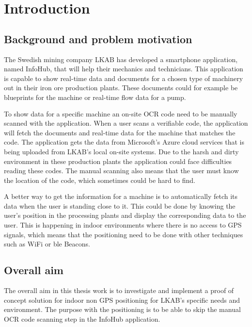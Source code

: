 \chapter{Introduction}\label{sec:intro} 

\section{Background and problem motivation}\label{sec:introBackground}
The Swedish mining company LKAB has developed a smartphone application, named InfoHub, that will help their mechanics and technicians.
This application is capable to show real-time data and documents for a chosen type of machinery out in their iron ore production plants.
These documents could for example be blueprints for the machine or real-time flow data for a pump.

\bigskip

To show data for a specific machine an on-site OCR code need to be manually scanned with the application.
When a user scans a verifiable code, the application will fetch the documents and real-time data for the machine that matches the code.
The application gets the data from Microsoft’s Azure cloud services that is being uploaded from LKAB’s local on-site systems.
Due to the harsh and dirty environment in these production plants the application could face difficulties reading these codes.
The manual scanning also means that the user must know the location of the code, which sometimes could be hard to find.

\bigskip

A better way to get the information for a machine is to automatically fetch its data when the user is standing close to it. 
This could be done by knowing the user's position in the processing plants and display the corresponding data to the user.
This is happening in indoor environments where there is no access to GPS signals, which means that the positioning need to be done with other techniques such as WiFi or \acrlong{ble} Beacons.


\section{Overall aim}\label{sec:introOverallAim}
The overall aim in this thesis work is to investigate and implement a proof of concept solution for indoor non GPS positioning for LKAB's specific needs and environment.
The purpose with the positioning is to be able to skip the manual OCR code scanning step in the InfoHub application.


